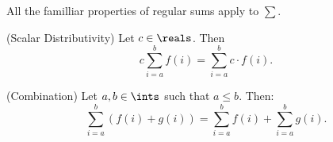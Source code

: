 All the familliar properties of regular sums apply to $\sum$.
\begin{prop} (Scalar Distributivity)
  Let $c \in \reals$. Then $$c \sum_{i=a}^{b} f(i) =
  \sum_{i=a}^{b} c \cdot f(i).$$
\end{prop}

\begin{prop} (Combination)
  Let $a, b \in \ints$ such that $a \leq b$. Then:
  $$\sum_{i=a}^{b} (f(i) + g(i))
  = \sum_{i=a}^{b} f(i) + \sum_{i=a}^{b} g(i).$$
\end{prop}
